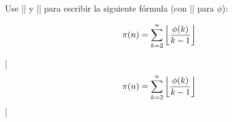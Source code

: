 

\bigskip

\enunciadoS Use |\left| y |\right| para escribir la siguiente
f\'ormula (con |\phi| para $\phi$):

$$\pi(n) = \sum^n_{k = 2}\left\lfloor\phi(k) \over k - 1\right\rfloor$$

\bigskip

\respuestaS
|$$\pi(n) = \sum^n_{k = 2}\left\lfloor\phi(k) \over k - 1\right\rfloor$$|

\bye

